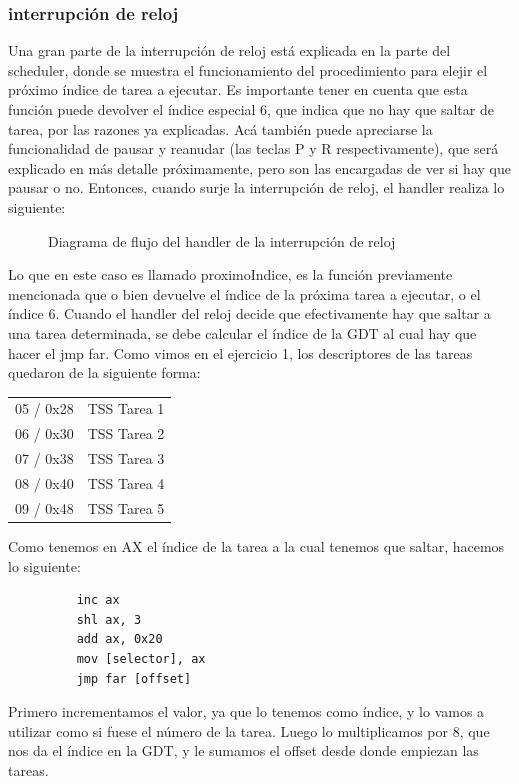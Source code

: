 \documentclass[10pt, a4paper]{article}
\begin{document}
\subsubsection*{interrupción de reloj}
Una gran parte de la interrupción de reloj está explicada en la parte del scheduler, donde se muestra el funcionamiento del procedimiento para elejir el próximo índice de tarea a ejecutar. Es importante tener en cuenta que esta función puede devolver el índice especial 6, que indica que no hay que saltar de tarea, por las razones ya explicadas.
Acá también puede apreciarse la funcionalidad de pausar y reanudar (las teclas P y R respectivamente), que será explicado en más detalle próximamente, pero son las encargadas de ver si hay que pausar o no.
Entonces, cuando surje la interrupción de reloj, el handler realiza lo siguiente:

	\begin{figure}[H]
  		\centering
		\caption{Diagrama de flujo del handler de la interrupción de reloj}
		\label{fig:iReloj}
	\end{figure}
Lo que en este caso es llamado proximoIndice, es la función previamente mencionada que o bien devuelve el índice de la próxima tarea a ejecutar, o el índice 6.
Cuando el handler del reloj decide que efectivamente hay que saltar a una tarea determinada, se debe calcular el índice de la GDT al cual hay que hacer el jmp far.
Como vimos en el ejercicio 1, los descriptores de las tareas quedaron de la siguiente forma:
\begin{table}[H]
\centering
    \begin{tabular}{|c|l|}
        \hline
        05 / 0x28 & TSS Tarea 1 \\ 
        06 / 0x30 & TSS Tarea 2 \\ 
        07 / 0x38 & TSS Tarea 3  \\ 
        08 / 0x40 & TSS Tarea 4 \\ 
        09 / 0x48 & TSS Tarea 5 \\ 
        \hline
    \end{tabular}
\end{table}
Como tenemos en AX el índice de la tarea a la cual tenemos que saltar, hacemos lo siguiente:
\begin{figure}[!h]
\begin{center}
\begin{verbatim}
	inc ax 
	shl ax, 3
	add ax, 0x20
	mov [selector], ax
	jmp far [offset]
\end{verbatim}
\end{center}
\end{figure}
Primero incrementamos el valor, ya que lo tenemos como índice, y lo vamos a utilizar como si fuese el número de la tarea. Luego lo multiplicamos por 8, que nos da el índice en la GDT, y le sumamos el offset desde donde empiezan las tareas.
\end{document}
